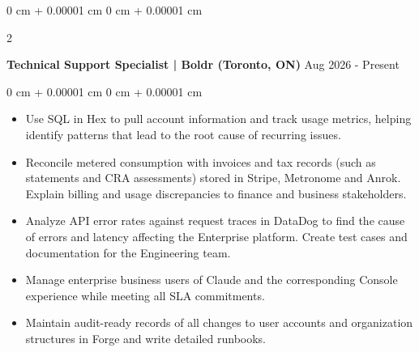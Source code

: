 \documentclass[10pt, letterpaper]{article}
\newenvironment{highlights}{
    \begin{itemize}[
        topsep=0.10 cm,
        parsep=0.10 cm,
        partopsep=0pt,
        itemsep=0pt,
        leftmargin=0 cm + 10pt
    ]
}{
    \end{itemize}
} %
\newenvironment{onecolentry}{
    \begin{adjustwidth}{
        0 cm + 0.00001 cm
    }{
        0 cm + 0.00001 cm
    }
}{
    \end{adjustwidth}
} %
\newenvironment{twocolentry}[2][]{
    \onecolentry
    \def\secondColumn{#2}
    \setcolumnwidth{\fill, 4.5 cm}
    \begin{paracol}{2}
}{
    \switchcolumn \raggedleft \secondColumn
    \end{paracol}
    \endonecolentry
} %
\begin{document}
        \begin{twocolentry}{
            {Aug 2026 - Present}
        }
            \textbf{Technical Support Specialist | Boldr (Toronto, ON)}\end{twocolentry}
        \vspace{0.10 cm}
        \begin{onecolentry}
            \begin{highlights}
                \item Use SQL in Hex to pull account information and track usage metrics, helping identify patterns that lead to the root cause of recurring issues.
                \item Reconcile metered consumption with invoices and tax records (such as statements and CRA assessments) stored in Stripe, Metronome and Anrok. Explain billing and usage discrepancies to finance and business stakeholders.
                \item Analyze API error rates against request traces in DataDog to find the cause of errors and latency affecting the Enterprise platform. Create test cases and documentation for the Engineering team.
                \item Manage enterprise business users of Claude and the corresponding Console experience while meeting all SLA commitments.
                \item Maintain audit-ready records of all changes to user accounts and organization structures in Forge and write detailed runbooks.
            \end{highlights}
        \end{onecolentry}
\end{document}
